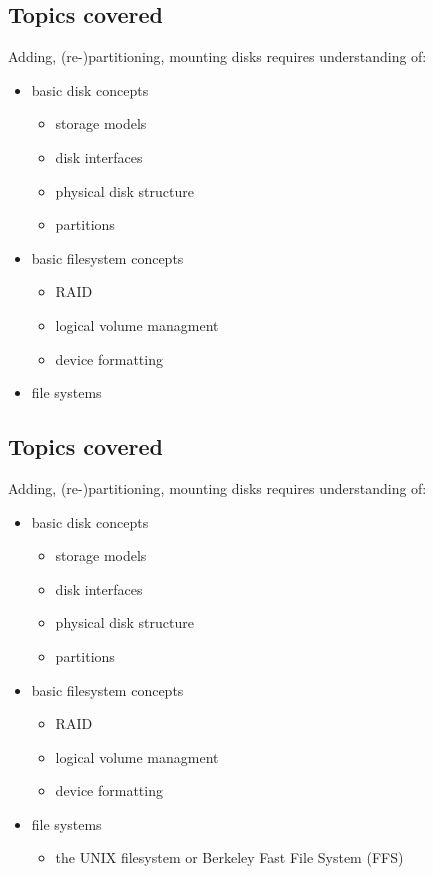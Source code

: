 \documentclass[xga]{xdvislides}
\begin{document}
\subsection{Topics covered}
Adding, (re-)partitioning, mounting disks requires understanding of:
\begin{itemize}
	\item basic disk concepts
		\begin{itemize}
			\item storage models
			\item disk interfaces
			\item physical disk structure
			\item partitions
		\end{itemize}
	\item basic filesystem concepts
		\begin{itemize}
			\item RAID
			\item logical volume managment
			\item device formatting
		\end{itemize}
	\item file systems
\end{itemize}

\subsection{Topics covered}
Adding, (re-)partitioning, mounting disks requires understanding of:
\begin{itemize}
	\item basic disk concepts
		\begin{itemize}
			\item storage models
			\item disk interfaces
			\item physical disk structure
			\item partitions
		\end{itemize}
	\item basic filesystem concepts
		\begin{itemize}
			\item RAID
			\item logical volume managment
			\item device formatting
		\end{itemize}
	\item file systems
		\begin{itemize}
			\item the UNIX filesystem or Berkeley Fast File System (FFS)
		\end{itemize}
\end{itemize}
\end{document}

